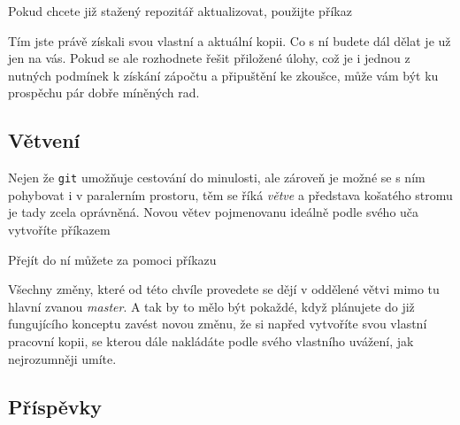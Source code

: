 \documentclass{report}
\newenvironment{Shaded}{}{}
\newcommand{\KeywordTok}[1]{\textcolor[rgb]{0.00,0.44,0.13}{\textbf{{#1}}}}
\newcommand{\NormalTok}[1]{{#1}}
\begin{document}
Pokud chcete již stažený repozitář aktualizovat, použijte příkaz

\begin{Shaded}
\end{Shaded}

Tím jste právě získali svou vlastní a aktuální kopii. Co s ní budete dál
dělat je už jen na vás. Pokud se ale rozhodnete řešit přiložené úlohy,
což je i jednou z nutných podmínek k získání zápočtu a připuštění ke
zkoušce, může vám být ku prospěchu pár dobře míněných rad.

    \subsection*{Větvení}\label{vux11btvenuxed}

Nejen že \texttt{git} umožňuje cestování do minulosti, ale zároveň je
možné se s ním pohybovat i v paralerním prostoru, těm se říká
\emph{větve} a představa košatého stromu je tady zcela oprávněná. Novou
větev pojmenovanu ideálně podle svého uča vytvoříte příkazem

\begin{Shaded}
\end{Shaded}

Přejít do ní můžete za pomoci příkazu

\begin{Shaded}
\end{Shaded}

Všechny změny, které od této chvíle provedete se dějí v oddělené větvi
mimo tu hlavní zvanou \emph{master}. A tak by to mělo být pokaždé, když
plánujete do již fungujícího konceptu zavést novou změnu, že si napřed
vytvoříte svou vlastní pracovní kopii, se kterou dále nakládáte podle
svého vlastního uvážení, jak nejrozumněji umíte.

    \subsection*{Příspěvky}\label{pux159uxedspux11bvky}
\end{document}
